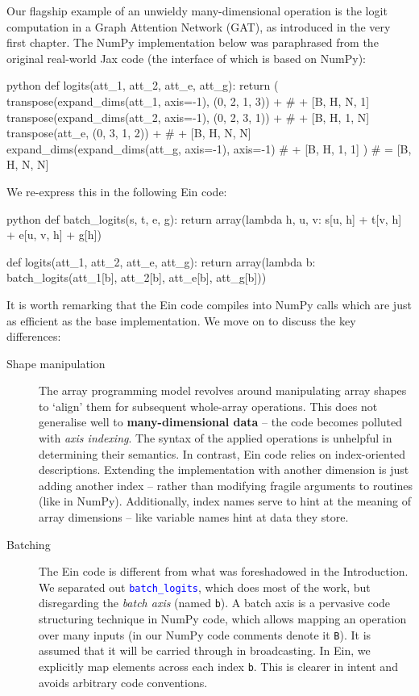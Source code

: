 Our flagship example of an unwieldy many-dimensional operation is the logit computation in a Graph Attention Network (GAT), as introduced in the very first chapter. The NumPy implementation below was paraphrased from the original real-world Jax code (the interface of which is based on NumPy):
\begin{center}
\begin{cminted}{python}
def logits(att_1, att_2, att_e, att_g):
    return (
        transpose(expand_dims(att_1, axis=-1), (0, 2, 1, 3)) +  # + [B, H, N, 1]
        transpose(expand_dims(att_2, axis=-1), (0, 2, 3, 1)) +  # + [B, H, 1, N]
        transpose(att_e, (0, 3, 1, 2)) +                        # + [B, H, N, N]
        expand_dims(expand_dims(att_g, axis=-1), axis=-1)       # + [B, H, 1, 1]
    )                                                           # = [B, H, N, N]
\end{cminted}
\end{center}
We re-express this in the following Ein code:
\begin{center}
\begin{cminted}{python}
def batch_logits(s, t, e, g):
    return array(lambda h, u, v: s[u, h] + t[v, h] + e[u, v, h] + g[h])

def logits(att_1, att_2, att_e, att_g):
    return array(lambda b: batch_logits(att_1[b], att_2[b], att_e[b], att_g[b]))
\end{cminted}
\end{center}
It is worth remarking that the Ein code compiles into NumPy calls which are just as efficient as the base implementation. We move on to discuss the key differences:

\begin{description}
    \item[Shape manipulation] The array programming model revolves around manipulating array shapes to `align' them for subsequent whole-array operations. This does not generalise well to \textbf{many-dimensional data} -- the code becomes polluted with \textit{axis indexing}. The syntax of the applied operations is unhelpful in determining their semantics. In contrast, Ein code relies on index-oriented descriptions. Extending the implementation with another dimension is just adding another index -- rather than modifying fragile arguments to routines (like in NumPy). Additionally, index names serve to hint at the meaning of array dimensions -- like variable names hint at data they store.
    \item[Batching] The Ein code is different from what was foreshadowed in the Introduction. We separated out \textcolor{blue}{\texttt{batch\_logits}}, which does most of the work, but disregarding the \textit{batch axis} (named \texttt{b}). A batch axis is a pervasive code structuring technique in NumPy code, which allows mapping an operation over many inputs (in our NumPy code comments denote it \texttt{B}). It is assumed that it will be carried through in broadcasting. In Ein, we explicitly map elements across each index \texttt{b}. This is clearer in intent and avoids arbitrary code conventions.
\end{description}

